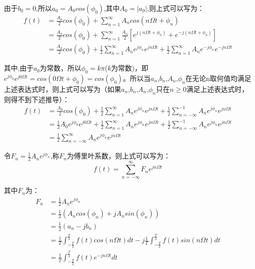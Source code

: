 \documentclass{article}
\numberwithin{equation}{section}
\numberwithin{figure}{section}
\begin{document}
由于$b_0=0$,所以$a_0=A_0cos(\phi_0)$,其中$A_0=|a_0|$,则上式可以写为：
\begin{equation}
    \begin{split}
        f(t)&=\frac{A_0}{2}cos(\phi_0)+\sum_{n = 1}^{\infty}A_ncos(n\Omega t+\phi_n)\\
        &=\frac{A_0}{2}cos(\phi_0)+\sum_{n = 1}^{\infty}\frac{A_n}{2}[e^{j(n\Omega t+\phi_n)}+e^{-j(n\Omega t+\phi_n)}]\\
        &=\frac{A_0}{2}cos(\phi_0)+\frac{1}{2}\sum_{n = 1}^{\infty}A_ne^{j\phi_n}e^{jn\Omega t}+\frac{1}{2}\sum_{n = 1}^{\infty}A_ne^{-j\phi_n}e^{-jn\Omega t}
    \end{split}
\end{equation}

其中,由于$a_0$为常数，所以$\phi_0=k\pi$($k$为常数)，即$e^{j\phi_0}e^{j0\Omega t}=cos(0\Omega t+\phi_0)=cos(\phi_0)$。所以当$a_n$,$b_n$,$A_n$,$\phi_n$在无论n取何值均满足上述表达式时，则上式可以写为（如果$a_n$,$b_n$,$A_n$,$\phi_n$只在$n≥0$满足上述表达式时，则得不到下述推导）：
\begin{equation}
    \begin{split}
        f(t)&=\frac{A_0}{2}cos(\phi_0)+\frac{1}{2}\sum_{n = 1}^{\infty}A_ne^{j\phi_n}e^{jn\Omega t}+\frac{1}{2}\sum_{n = -\infty}^{-1}A_ne^{j\phi_n}e^{jn\Omega t}\\
        &=\frac{1}{2}A_0e^{j\phi_0}e^{j0\Omega t}+\frac{1}{2}\sum_{n = 1}^{\infty}A_ne^{j\phi_n}e^{jn\Omega t}+\frac{1}{2}\sum_{n = -\infty}^{-1}A_ne^{j\phi_n}e^{jn\Omega t}\\
        &=\frac{1}{2}\sum_{n = -\infty}^{\infty}A_ne^{j\phi_n}e^{jn\Omega t}
    \end{split}
\end{equation}

令$F_n=\frac{1}{2}A_ne^{j\phi_n}$,称$F_n$为傅里叶系数，则上式可以写为：
\begin{equation}
    f(t)=\sum_{n = -\infty}^{\infty}F_ne^{jn\Omega t}
\end{equation}

其中$F_n$为：
\begin{equation}
    \begin{split}
        F_n&=\frac{1}{2}A_ne^{j\phi_n}\\
        &=\frac{1}{2}(A_ncos(\phi_n)+jA_nsin(\phi_n))\\
        &=\frac{1}{2}(a_n-jb_n)\\
        &=\frac{1}{T}\int_{-\frac{T}{2}}^{\frac{T}{2}}f(t)cos(n\Omega t)dt-j\frac{1}{T}\int_{-\frac{T}{2}}^{\frac{T}{2}}f(t)sin(n\Omega t)dt\\
        &=\frac{1}{T}\int_{-\frac{T}{2}}^{\frac{T}{2}}f(t)e^{-jn\Omega t}dt
    \end{split}
\end{equation}
\end{document}

